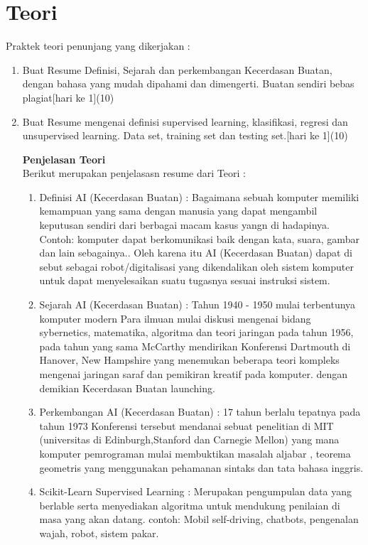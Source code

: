 \section{Teori}
Praktek teori penunjang yang dikerjakan :
\begin{enumerate}
    \item
          Buat Resume Definisi, Sejarah dan perkembangan Kecerdasan Buatan, dengan bahasa yang mudah dipahami dan dimengerti. Buatan sendiri bebas plagiat[hari ke 1](10)
    \item
          Buat Resume mengenai definisi supervised learning, klasifikasi, regresi dan unsupervised learning. Data set, training set dan testing set.[hari ke 1](10)


          \textbf{Penjelasan Teori}
          \\Berikut merupakan penjelasasn resume dari Teori :
          \begin{enumerate}
              \item Definisi AI (Kecerdasan Buatan) : Bagaimana sebuah komputer memiliki kemampuan yang sama dengan manusia yang dapat mengambil keputusan sendiri dari berbagai macam kasus yangn di hadapinya. Contoh: komputer dapat berkomunikasi baik dengan kata, suara, gambar dan lain sebagainya.. Oleh karena itu AI (Kecerdasan Buatan) dapat di sebut sebagai robot/digitalisasi yang dikendalikan oleh sistem komputer untuk dapat menyelesaikan suatu tugasnya sesuai instruksi sistem.

              \item Sejarah AI (Kecerdasan Buatan) : Tahun 1940 - 1950 mulai terbentunya komputer modern Para ilmuan mulai diskusi mengenai bidang sybernetics, matematika, algoritma dan teori jaringan pada tahun 1956, pada tahun yang sama McCarthy mendirikan Konferensi Dartmouth di Hanover, New Hampshire yang menemukan beberapa teori kompleks mengenai jaringan saraf dan pemikiran kreatif pada komputer. dengan demikian Kecerdasan Buatan launching.

              \item Perkembangan AI (Kecerdasan Buatan) : 17 tahun berlalu tepatnya pada tahun 1973 Konferensi tersebut mendanai sebuat penelitian di MIT (universitas di Edinburgh,Stanford dan Carnegie Mellon) yang mana komputer pemrograman mulai membuktikan masalah aljabar , teorema geometris yang menggunakan pehamanan sintaks dan tata bahasa inggris.

              \item Scikit-Learn Supervised Learning : Merupakan pengumpulan data yang berlable serta menyediakan algoritma untuk mendukung penilaian di masa yang akan datang. contoh: Mobil self-driving, chatbots, pengenalan wajah, robot, sistem pakar.


\end{enumerate}
\end{enumerate}
